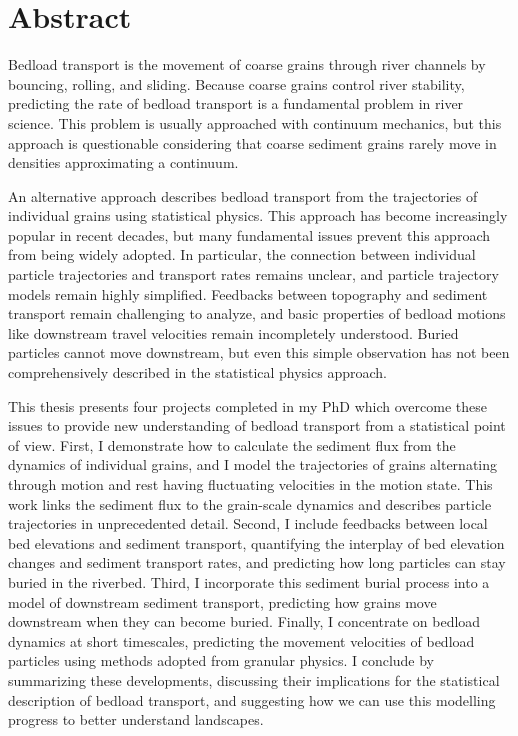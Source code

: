 
\chapter{Abstract}

Bedload transport is the movement of coarse grains through river channels by bouncing, rolling, and sliding. Because coarse grains control river stability, predicting the rate of bedload transport is a fundamental problem in river science.
This problem is usually approached with continuum mechanics, but this approach is questionable considering that coarse sediment grains rarely move in densities approximating a continuum.

An alternative approach describes bedload transport from the trajectories of individual grains using statistical physics.
This approach has become increasingly popular in recent decades, but many fundamental issues prevent this approach from being widely adopted.
In particular, the connection between individual particle trajectories and transport rates remains unclear, and particle trajectory models remain highly simplified.
Feedbacks between topography and sediment transport remain challenging to analyze, and basic properties of bedload motions like downstream travel velocities remain incompletely understood.
Buried particles cannot move downstream, but even this simple observation has not been comprehensively described in the statistical physics approach.

This thesis presents four projects completed in my PhD which overcome these issues to provide new understanding of bedload transport from a statistical point of view.
First, I demonstrate how to calculate the sediment flux from the dynamics of individual grains, and I model the trajectories of grains alternating through motion and rest having fluctuating velocities in the motion state.
This work links the sediment flux to the grain-scale dynamics and describes particle trajectories in unprecedented detail.
Second, I include feedbacks between local bed elevations and sediment transport, quantifying the interplay of bed elevation changes and sediment transport rates, and predicting how long particles can stay buried in the riverbed.
Third, I incorporate this sediment burial process into a model of downstream sediment transport, predicting how grains move downstream when they can become buried.
Finally, I concentrate on bedload dynamics at short timescales, predicting the movement velocities of bedload particles using methods adopted from granular physics.
I conclude by summarizing these developments, discussing their implications for the statistical description of bedload transport, and suggesting how we can use this modelling progress to better understand landscapes.


